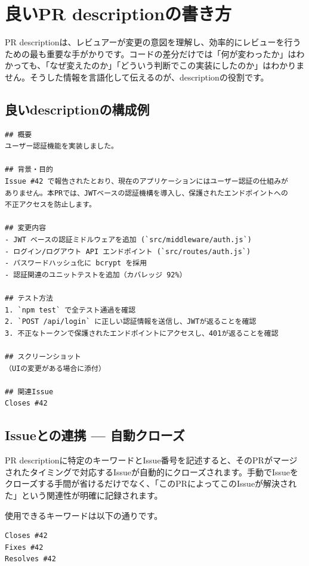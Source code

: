 \section{良いPR descriptionの書き方}

PR descriptionは、レビュアーが変更の意図を理解し、効率的にレビューを行うための最も重要な手がかりです。コードの差分だけでは「何が変わったか」はわかっても、「なぜ変えたのか」「どういう判断でこの実装にしたのか」はわかりません。そうした情報を言語化して伝えるのが、descriptionの役割です。

\subsection{良いdescriptionの構成例}

\begin{lstlisting}[language={}]
## 概要
ユーザー認証機能を実装しました。

## 背景・目的
Issue #42 で報告されたとおり、現在のアプリケーションにはユーザー認証の仕組みが
ありません。本PRでは、JWTベースの認証機構を導入し、保護されたエンドポイントへの
不正アクセスを防止します。

## 変更内容
- JWT ベースの認証ミドルウェアを追加 (`src/middleware/auth.js`)
- ログイン/ログアウト API エンドポイント (`src/routes/auth.js`)
- パスワードハッシュ化に bcrypt を採用
- 認証関連のユニットテストを追加（カバレッジ 92%）

## テスト方法
1. `npm test` で全テスト通過を確認
2. `POST /api/login` に正しい認証情報を送信し、JWTが返ることを確認
3. 不正なトークンで保護されたエンドポイントにアクセスし、401が返ることを確認

## スクリーンショット
（UIの変更がある場合に添付）

## 関連Issue
Closes #42
\end{lstlisting}

\subsection{Issueとの連携 --- 自動クローズ}

PR descriptionに特定のキーワードとIssue番号を記述すると、そのPRがマージされたタイミングで対応するIssueが自動的にクローズされます。手動でIssueをクローズする手間が省けるだけでなく、「このPRによってこのIssueが解決された」という関連性が明確に記録されます。

使用できるキーワードは以下の通りです。

\begin{lstlisting}[language={}]
Closes #42
Fixes #42
Resolves #42
\end{lstlisting}

